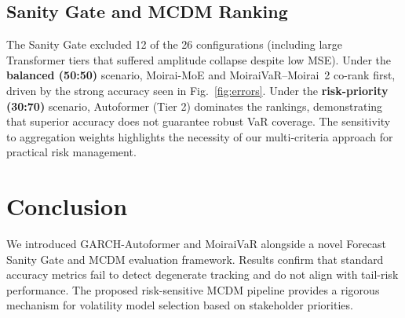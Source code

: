 \documentclass[runningheads,a4paper]{llncs}
\begin{document}
\subsection{Sanity Gate and MCDM Ranking}

The Sanity Gate excluded 12 of the 26 configurations (including large Transformer tiers that suffered amplitude collapse despite low MSE). 
Under the \textbf{balanced (50:50)} scenario, Moirai-MoE and MoiraiVaR--Moirai~2 co-rank first, driven by the strong accuracy seen in Fig.~\ref{fig:errors}. 
Under the \textbf{risk-priority (30:70)} scenario, Autoformer (Tier 2) dominates the rankings, demonstrating that superior accuracy does not guarantee robust VaR coverage. The sensitivity to aggregation weights highlights the necessity of our multi-criteria approach for practical risk management.

\section{Conclusion}

We introduced GARCH-Autoformer and MoiraiVaR alongside a novel Forecast Sanity Gate and MCDM evaluation framework. Results confirm that standard accuracy metrics fail to detect degenerate tracking and do not align with tail-risk performance. The proposed risk-sensitive MCDM pipeline provides a rigorous mechanism for volatility model selection based on stakeholder priorities.
\end{document}
